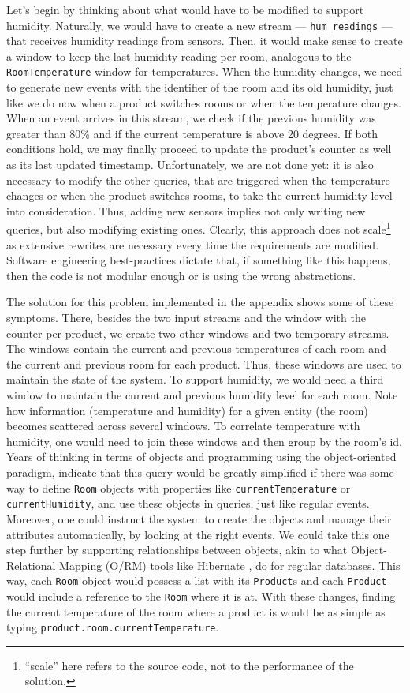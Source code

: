 \documentclass[a4,11pt]{report}
\begin{document}
Let's begin by thinking about what would have to be modified to
support humidity. Naturally, we would have to create a new stream ---
\verb=hum_readings= --- that receives humidity readings from
sensors. Then, it would make sense to create a window to keep the last
humidity reading per room, analogous to the \verb=RoomTemperature=
window for temperatures. When the humidity changes, we need to
generate new events with the identifier of the room and its old
humidity, just like we do now when a product switches rooms or when
the temperature changes. When an event arrives in this stream, we
check if the previous humidity was greater than 80\% and if the
current temperature is above 20 degrees. If both conditions hold, we
may finally proceed to update the product's counter as well as its
last updated timestamp. Unfortunately, we are not done yet: it is also
necessary to modify the other queries, that are triggered when the
temperature changes or when the product switches rooms, to take the
current humidity level into consideration. Thus, adding new sensors
implies not only writing new queries, but also modifying existing
ones. Clearly, this approach does not scale\footnote{``scale'' here
  refers to the source code, not to the performance of the solution.}
as extensive rewrites are necessary every time the requirements are
modified. Software engineering best-practices dictate that, if
something like this happens, then the code is not modular enough or is
using the wrong abstractions.

The solution for this problem implemented in the appendix shows some
of these symptoms. There, besides the two input streams and the window
with the counter per product, we create two other windows and two
temporary streams. The windows contain the current and previous
temperatures of each room and the current and previous room for each
product. Thus, these windows are used to maintain the state of the
system. To support humidity, we would need a third window to maintain
the current and previous humidity level for each room. Note how
information (temperature and humidity) for a given entity (the room)
becomes scattered across several windows. To correlate temperature
with humidity, one would need to join these windows and then group by
the room's id. Years of thinking in terms of objects and programming
using the object-oriented paradigm, indicate that this query would be
greatly simplified if there was some way to define \verb=Room= objects
with properties like \verb=currentTemperature= or
\verb=currentHumidity=, and use these objects in queries, just like
regular events. Moreover, one could instruct the system to create the
objects and manage their attributes automatically, by looking at the
right events. We could take this one step further by supporting
relationships between objects, akin to what Object-Relational Mapping
(O/RM) tools like Hibernate \cite{hibernate:www}, do for regular
databases. This way, each \verb=Room= object would possess a list with
its \verb=Product=s and each \verb=Product= would include a reference
to the \verb=Room= where it is at. With these changes, finding the
current temperature of the room where a product is would be as simple
as typing \verb=product.room.currentTemperature=.
\end{document}

